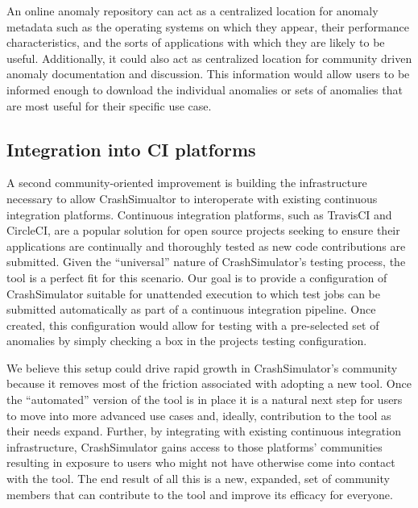 \documentclass[twocolumn]{article}
\begin{document}
An online anomaly repository can act as a centralized location for anomaly
metadata such as
the operating systems on which they appear,
their performance characteristics, and the sorts of applications
with which they are likely to be useful.  Additionally, it could also
act as centralized location for community driven anomaly documentation
and discussion.  This information would allow users to be informed enough
to download the individual anomalies or sets of anomalies that are most
useful for their specific use case.


\subsection{Integration into CI platforms}

A second community-oriented improvement is building the infrastructure
necessary to allow CrashSimualtor to interoperate with existing continuous
integration platforms.  Continuous integration platforms, such as TravisCI
and CircleCI, are a popular solution for open source projects seeking to
ensure their applications are continually and thoroughly tested as new code
contributions are submitted.  Given the ``universal'' nature of
CrashSimulator's testing process, the tool is a perfect fit for this
scenario.  Our goal is to provide a configuration of CrashSimulator
suitable for unattended execution to which test jobs can be submitted
automatically as part of a continuous integration pipeline.  Once created,
this configuration would allow for testing with a
pre-selected set of anomalies by simply checking a box in the projects
testing configuration.

We believe this setup could drive rapid growth in CrashSimulator's
community because it removes most of the friction associated with adopting
a new tool.  Once the ``automated'' version of the tool is in place it is a
natural next step for users to move into more advanced use cases and,
ideally, contribution to the tool as their needs expand.  Further, by
integrating with existing continuous integration infrastructure,
CrashSimulator gains access to those platforms' communities resulting in
exposure to users who might not have otherwise come into contact with the
tool.  The end result of all this is a new, expanded, set of community
members that can contribute to the tool and improve its efficacy for
everyone.

%
\end{document}

